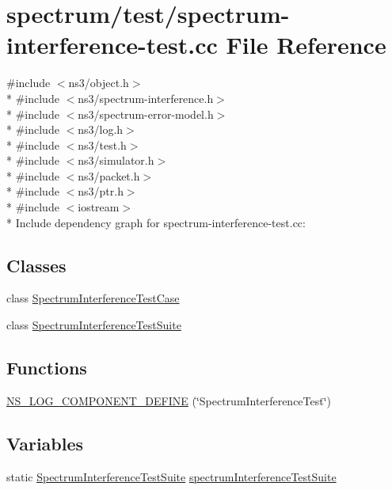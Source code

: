 \hypertarget{spectrum-interference-test_8cc}{}\section{spectrum/test/spectrum-\/interference-\/test.cc File Reference}
\label{spectrum-interference-test_8cc}
{\ttfamily \#include $<$ns3/object.\+h$>$}\\*
{\ttfamily \#include $<$ns3/spectrum-\/interference.\+h$>$}\\*
{\ttfamily \#include $<$ns3/spectrum-\/error-\/model.\+h$>$}\\*
{\ttfamily \#include $<$ns3/log.\+h$>$}\\*
{\ttfamily \#include $<$ns3/test.\+h$>$}\\*
{\ttfamily \#include $<$ns3/simulator.\+h$>$}\\*
{\ttfamily \#include $<$ns3/packet.\+h$>$}\\*
{\ttfamily \#include $<$ns3/ptr.\+h$>$}\\*
{\ttfamily \#include $<$iostream$>$}\\*
Include dependency graph for spectrum-\/interference-\/test.cc\+:
\subsection*{Classes}
\begin{DoxyCompactItemize}
\item 
class \hyperlink{classSpectrumInterferenceTestCase}{Spectrum\+Interference\+Test\+Case}
\item 
class \hyperlink{classSpectrumInterferenceTestSuite}{Spectrum\+Interference\+Test\+Suite}
\end{DoxyCompactItemize}
\subsection*{Functions}
\begin{DoxyCompactItemize}
\item 
\hyperlink{spectrum-interference-test_8cc_a33f5958fe2f9c17e3b134bbbefd88036}{N\+S\+\_\+\+L\+O\+G\+\_\+\+C\+O\+M\+P\+O\+N\+E\+N\+T\+\_\+\+D\+E\+F\+I\+NE} (\char`\"{}Spectrum\+Interference\+Test\char`\"{})
\end{DoxyCompactItemize}
\subsection*{Variables}
\begin{DoxyCompactItemize}
\item 
static \hyperlink{classSpectrumInterferenceTestSuite}{Spectrum\+Interference\+Test\+Suite} \hyperlink{spectrum-interference-test_8cc_a7ac0e48911087ad4bf4e450c108be135}{spectrum\+Interference\+Test\+Suite}
\end{DoxyCompactItemize}


